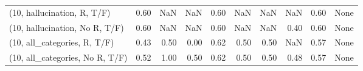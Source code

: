 \begin{table*}[h!]
\begin{adjustbox}{width=2\columnwidth,center}
\begin{tabular}{lrrr|rrr|rrr}
(10, hallucination, R, T/F)           &                      0.60 &                   NaN &                       NaN &                          0.60 &                       NaN &                           NaN &                                    NaN &                               0.60 &                                  None \\
(10, hallucination, No R, T/F)        &                      0.60 &                   NaN &                       NaN &                          0.60 &                       NaN &                           NaN &                                   0.40 &                               0.60 &                                  None \\
(10, all\_categories, R, T/F)          &                      0.43 &                  0.50 &                      0.00 &                          0.62 &                      0.50 &                          0.50 &                                    NaN &                               0.57 &                                  None \\
(10, all\_categories, No R, T/F)       &                      0.52 &                  1.00 &                      0.50 &                          0.62 &                      0.50 &                          0.50 &                                   0.48 &                               0.57 &                                  None \\




\end{tabular}
\end{adjustbox}
\end{table*}
